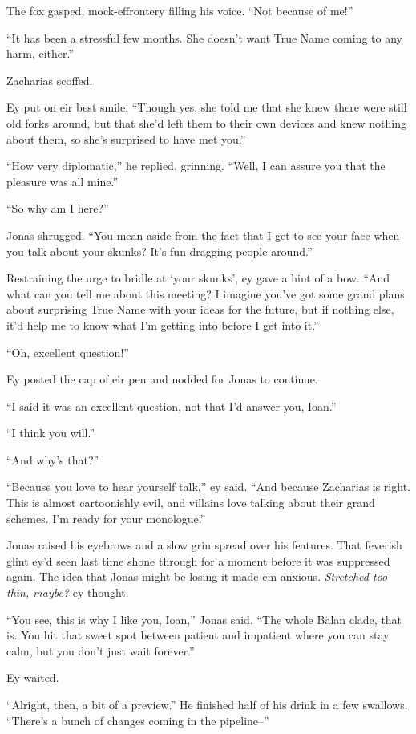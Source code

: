 The fox gasped, mock-effrontery filling his voice. ``Not because of me!''

``It has been a stressful few months. She doesn't want True Name coming to any harm, either.''

Zacharias scoffed.

Ey put on eir best smile. ``Though yes, she told me that she knew there were still old forks around, but that she'd left them to their own devices and knew nothing about them, so she's surprised to have met you.''

``How very diplomatic,'' he replied, grinning. ``Well, I can assure you that the pleasure was all mine.''

``So why am I here?''

Jonas shrugged. ``You mean aside from the fact that I get to see your face when you talk about your skunks? It's fun dragging people around.''

Restraining the urge to bridle at `your skunks', ey gave a hint of a bow. ``And what can you tell me about this meeting? I imagine you've got some grand plans about surprising True Name with your ideas for the future, but if nothing else, it'd help me to know what I'm getting into before I get into it.''

``Oh, excellent question!''

Ey posted the cap of eir pen and nodded for Jonas to continue.

``I said it was an excellent question, not that I'd answer you, Ioan.''

``I think you will.''

``And why's that?''

``Because you love to hear yourself talk,'' ey said. ``And because Zacharias is right. This is almost cartoonishly evil, and villains love talking about their grand schemes. I'm ready for your monologue.''

Jonas raised his eyebrows and a slow grin spread over his features. That feverish glint ey'd seen last time shone through for a moment before it was suppressed again. The idea that Jonas might be losing it made em anxious. \emph{Stretched too thin, maybe?} ey thought.

``You see, this is why I like you, Ioan,'' Jonas said. ``The whole Bălan clade, that is. You hit that sweet spot between patient and impatient where you can stay calm, but you don't just wait forever.''

Ey waited.

``Alright, then, a bit of a preview.'' He finished half of his drink in a few swallows. ``There's a bunch of changes coming in the pipeline--''

